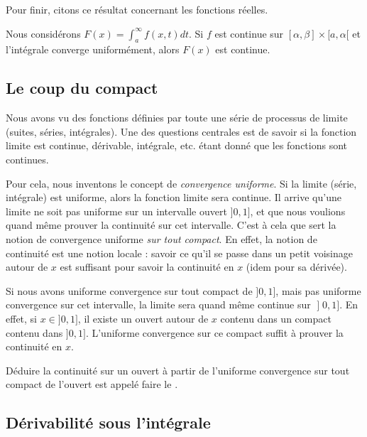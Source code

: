 Pour finir, citons ce résultat concernant les fonctions réelles.
\begin{theorem}		\label{ThoInDerrtCvUnifFContinue}
    Nous considérons \( F(x)=\int_a^{\infty}f(x,t)dt\). Si \( f\) est continue sur $[\alpha,\beta]\times[a,\alpha[$ et l'intégrale converge uniformément, alors $F(x)$ est continue.
\end{theorem}

\subsection{Le coup du compact}

Nous avons vu des fonctions définies par toute une série de processus de limite (suites, séries, intégrales). Une des questions centrales est de savoir si la fonction limite est continue, dérivable, intégrale, etc. étant donné que les fonctions sont continues.

Pour cela, nous inventons le concept de \emph{convergence uniforme}. Si la limite (série, intégrale) est uniforme, alors la fonction limite sera continue. Il arrive qu'une limite ne soit pas uniforme sur un intervalle ouvert $]0,1]$, et que nous voulions quand même prouver la continuité sur cet intervalle. C'est à cela que sert la notion de convergence uniforme \emph{sur tout compact}. En effet, la notion de continuité est une notion locale : savoir ce qu'il se passe dans un petit voisinage autour de $x$ est suffisant pour savoir la continuité en $x$ (idem pour sa dérivée).

Si nous avons uniforme convergence sur tout compact de $]0,1]$, mais pas uniforme convergence sur cet intervalle, la limite sera quand même continue sur $\mathopen] 0 , 1 \mathclose]$. En effet, si $x\in]0,1]$, il existe un ouvert autour de $x$ contenu dans un compact contenu dans $]0,1]$. L'uniforme convergence sur ce compact suffit à prouver la continuité en $x$.

Déduire la continuité sur un ouvert à partir de l'uniforme convergence sur tout compact de l'ouvert est appelé faire le .


\subsection{Dérivabilité sous l'intégrale}

